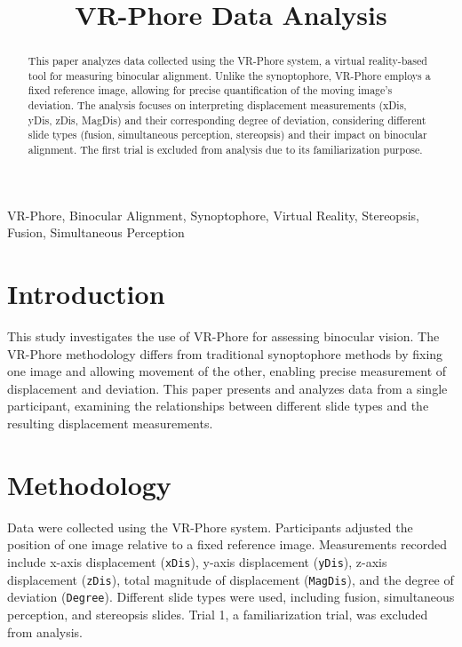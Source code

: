 \documentclass[conference]{IEEEtran}
\title{VR-Phore Data Analysis}
\author{\IEEEauthorblockN{ }
\IEEEauthorblockA{\\
}
}
\begin{document}
\maketitle

\begin{abstract}
This paper analyzes data collected using the VR-Phore system, a virtual reality-based tool for measuring binocular alignment.  Unlike the synoptophore, VR-Phore employs a fixed reference image, allowing for precise quantification of the moving image's deviation.  The analysis focuses on interpreting displacement measurements (xDis, yDis, zDis, MagDis) and their corresponding degree of deviation, considering different slide types (fusion, simultaneous perception, stereopsis) and their impact on binocular alignment.  The first trial is excluded from analysis due to its familiarization purpose.
\end{abstract}

\begin{IEEEkeywords}
VR-Phore, Binocular Alignment, Synoptophore, Virtual Reality, Stereopsis, Fusion, Simultaneous Perception
\end{IEEEkeywords}

\section{Introduction}
This study investigates the use of VR-Phore for assessing binocular vision.  The VR-Phore methodology differs from traditional synoptophore methods by fixing one image and allowing movement of the other, enabling precise measurement of displacement and deviation. This paper presents and analyzes data from a single participant, examining the relationships between different slide types and the resulting displacement measurements.

\section{Methodology}
Data were collected using the VR-Phore system.  Participants adjusted the position of one image relative to a fixed reference image. Measurements recorded include x-axis displacement (\texttt{xDis}), y-axis displacement (\texttt{yDis}), z-axis displacement (\texttt{zDis}), total magnitude of displacement (\texttt{MagDis}), and the degree of deviation (\texttt{Degree}).  Different slide types were used, including fusion, simultaneous perception, and stereopsis slides.  Trial 1, a familiarization trial, was excluded from analysis.
\end{document}
